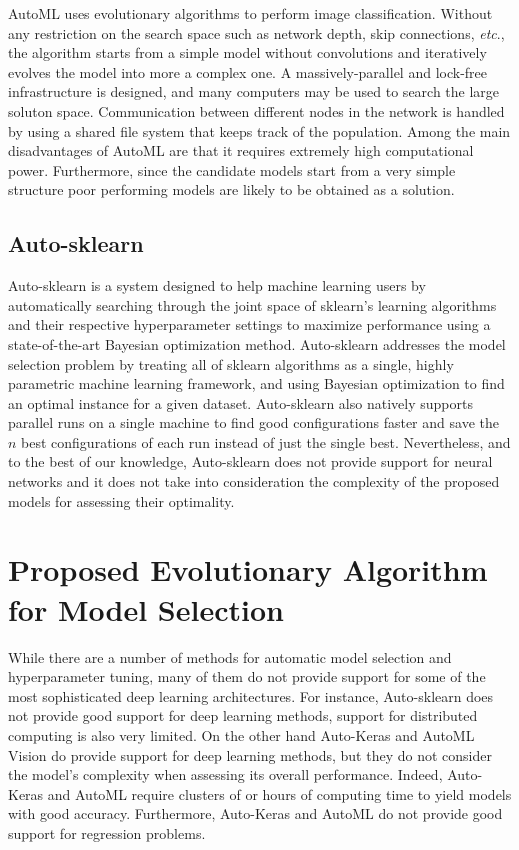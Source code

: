 \documentclass[12pt]{elsart}%
\begin{document}
AutoML \cite{AutoML2017} uses evolutionary algorithms to perform image classification. Without any restriction on the search space such as network depth, skip connections, \textit{etc}., the algorithm starts from a simple model without convolutions and iteratively evolves the model into more a complex one. A massively-parallel and lock-free infrastructure is designed, and many computers may be used to search the large soluton space. Communication between different nodes in the network is handled by using a shared file system that keeps track of the population. Among the main disadvantages of AutoML are that it requires extremely high computational power. Furthermore, since the candidate models start from a very simple structure poor performing models are likely to be obtained as a solution.

\subsection{Auto-sklearn}

Auto-sklearn \cite{Feurer2015} is a system designed to help machine learning users by automatically searching through the joint space of sklearn's learning algorithms and their respective hyperparameter settings to maximize performance using a state-of-the-art Bayesian optimization method. Auto-sklearn addresses the model selection problem by treating all of sklearn algorithms as a single, highly parametric machine learning framework, and using Bayesian optimization to find an optimal instance for a given dataset. Auto-sklearn also natively supports parallel runs on a single machine to find good configurations faster and save the $n$ best configurations of each run instead of just the single best. Nevertheless, and to the best of our knowledge, Auto-sklearn does not provide support for neural networks and it does not take into consideration the complexity of the proposed models for assessing their optimality.


\section{Proposed Evolutionary Algorithm for Model Selection}
\label{sec:auto_nn}

While there are a number of methods for automatic model selection and hyperparameter tuning, many of them do not provide support for some of the most sophisticated deep learning architectures. For instance, Auto-sklearn does not provide good support for deep learning methods, support for distributed computing is also very limited. On the other hand Auto-Keras and AutoML Vision do provide support for deep learning methods, but they do not consider the model's complexity when assessing its overall performance. Indeed, Auto-Keras and AutoML require clusters of or hours of computing time to yield models with good accuracy. Furthermore, Auto-Keras and AutoML do not provide good support for regression problems. 
\end{document}
